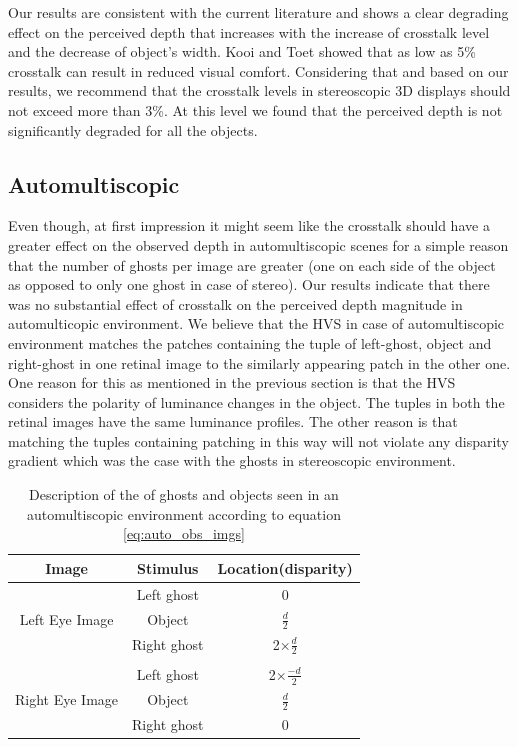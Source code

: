 Our results are consistent with the current literature and shows a clear degrading effect on the perceived depth that increases with the increase of crosstalk level and the decrease of object's width. Kooi and Toet \cite{kooi2004visual} showed that as low as 5\% crosstalk can result in reduced visual comfort. Considering that and based on our results, we recommend that the crosstalk levels in stereoscopic 3D displays should not exceed more than 3\%. At this level we found that the perceived depth is not significantly degraded for all the objects. \pagebreak


\subsection{Automultiscopic}

Even though, at first impression it might seem like the crosstalk should have a greater effect on the observed depth in automultiscopic scenes for a simple reason that the number of ghosts per image are greater (one on each side of the object as opposed to only one ghost in case of stereo). Our results indicate that there was no substantial effect of crosstalk on the perceived depth magnitude in automulticopic environment. We believe that the HVS in case of automultiscopic environment matches the patches containing the tuple of left-ghost, object and right-ghost in one retinal image to the similarly appearing patch in the other one. One reason for this as mentioned in the previous section is that the HVS considers the polarity of luminance changes in the object. The tuples in both the retinal images have the same luminance profiles. The other reason is that matching the tuples containing patching in this way will not violate any disparity gradient which was the case with the ghosts in stereoscopic environment.

\begin{table}[ht!]
  \begin{center}
    \caption{Description of the of ghosts and objects seen in an automultiscopic environment according to equation \ref{eq:auto_obs_imgs}}
    \label{tab:ghost_obj_names}
    \begin{tabular}{ccc}
      \toprule
      Image & Stimulus  & Location(disparity)\\
      \midrule
                       & Left ghost & 0  \\
      Left Eye Image   & Object & $\frac{d}{2}$\\
                       & Right ghost & 2$\times$$\frac{d}{2}$\\
                       &             & \\
                       & Left ghost & 2$\times$$\frac{-d}{2}$  \\
      Right Eye Image  & Object & $\frac{d}{2}$\\
                       & Right ghost & 0\\
      \bottomrule
    \end{tabular}
  \end{center}
\end{table}

